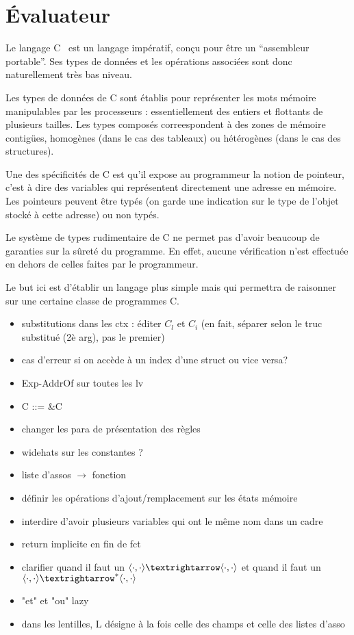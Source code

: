 


\section{Évaluateur} %


Le langage C~\cite{KandR} est un langage impératif, conçu pour être un
``assembleur portable''. Ses types de données et les opérations associées sont
donc naturellement très bas niveau.

Les types de données de C sont établis pour représenter les mots mémoire
manipulables par les processeurs : essentiellement des entiers et flottants de
plusieurs tailles. Les types composés correespondent à des zones de mémoire
contigües, homogènes (dans le cas des tableaux) ou hétérogènes (dans le cas des
structures).

Une des spécificités de C est qu'il expose au programmeur la notion de pointeur,
c'est à dire des variables qui représentent directement une adresse en mémoire.
Les pointeurs peuvent être typés (on garde une indication sur le type de l'objet
stocké à cette adresse) ou non typés.

Le système de types rudimentaire de C ne permet pas d'avoir beaucoup de
garanties sur la sûreté du programme. En effet, aucune vérification n'est
effectuée en dehors de celles faites par le programmeur.

Le but ici est d'établir un langage plus simple mais qui permettra de raisonner
sur une certaine classe de programmes C.


\begin{itemize}
\item substitutions dans les ctx : éditer $C_l$ et $C_i$
  (en fait, séparer selon le truc substitué (2è arg), pas le premier)
\item cas d'erreur si on accède à un index d'une struct ou vice versa?
\item Exp-AddrOf sur toutes les lv
\item C ::= \&C
\item changer les para de présentation des règles
\item widehats sur les constantes ?
\item liste d'assos $→$ fonction
\item définir les opérations d'ajout/remplacement sur les états mémoire
\item interdire d'avoir plusieurs variables qui ont le même nom dans un cadre
\item return implicite en fin de fct
\item clarifier quand il faut un $\mm{\cdot}{\cdot}{\cdot}{\cdot}$
             et quand il faut un $\mmstar{\cdot}{\cdot}{\cdot}{\cdot}$
\item "et" et "ou" lazy
\item dans les lentilles, L désigne à la fois celle des champs et celle des
listes d'asso
\end{itemize}

